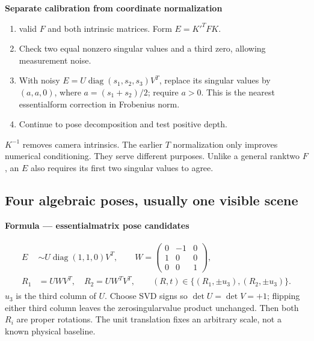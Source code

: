 \documentclass[letterpaper,11pt,english,openany,oneside]{jupyterBook}
\begin{document}
\begin{TextbookBox}
\textbf{Separate calibration from coordinate normalization}\par\smallskip
\begin{enumerate}
%
\item {}
\sphinxAtStartPar
{} valid \(F\) and both intrinsic matrices. Form \(E=K'^TFK\).

\item {}
\sphinxAtStartPar
Check two equal nonzero singular values and a third zero, allowing measurement noise.

\item {}
\sphinxAtStartPar
With noisy \(E=U\operatorname{diag}(s_1,s_2,s_3)V^T\), replace its singular values by \((a,a,0)\), where \(a=(s_1+s_2)/2\); require \(a>0\). This is the nearest essential\sphinxhyphen{}form correction in Frobenius norm.

\item {}
\sphinxAtStartPar
Continue to pose decomposition and test positive depth.

\end{enumerate}

\sphinxAtStartPar
\(K^{-1}\) removes camera intrinsics. The earlier \(T\) normalization only improves numerical conditioning. They serve different purposes. Unlike a general rank\sphinxhyphen{}two \(F\), an \(E\) also requires its first two singular values to agree.

\end{TextbookBox}


\subsection{Four algebraic poses, usually one visible scene}
\label{\detokenize{lectures/lecture04/essential:four-algebraic-poses-usually-one-visible-scene}}
\begin{TextbookBox}
\textbf{Formula — essential\sphinxhyphen{}matrix pose candidates}\par\smallskip
\begin{equation}\label{equation:lectures/lecture04/essential:eq-lec04-poses}
\begin{split}\begin{aligned}
E&\sim U\operatorname{diag}(1,1,0)V^T,\qquad
W=\begin{pmatrix}0&-1&0\\1&0&0\\0&0&1\end{pmatrix},\\
R_1&=UWV^T,\quad R_2=UW^TV^T,\qquad
(R,t)\in\{(R_1,\pm u_3),(R_2,\pm u_3)\}.
\end{aligned}\end{split}
\end{equation}
\sphinxAtStartPar
\(u_3\) is the third column of \(U\). Choose SVD signs so \(\det U=\det V=+1\); flipping either third column leaves the zero\sphinxhyphen{}singular\sphinxhyphen{}value product unchanged. Then both \(R_i\) are proper rotations. The unit translation fixes an arbitrary scale, not a known physical baseline.

\end{TextbookBox}
\end{document}
